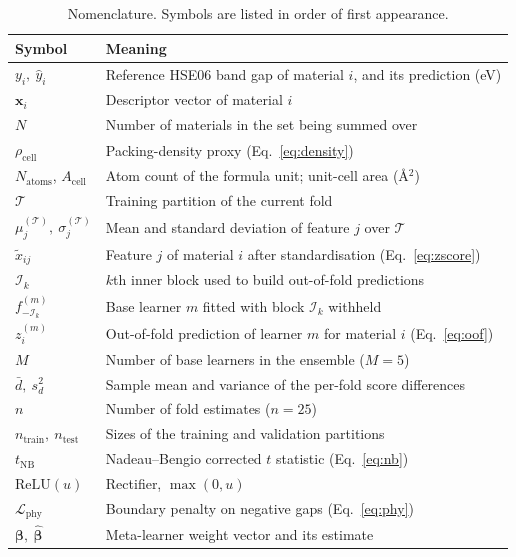 \documentclass{ieeeaccess}
\begin{document}
\begin{table}[!t]
\caption{Nomenclature. Symbols are listed in order of first appearance.\label{tab:nomenclature}}
\centering
\small
\begin{tabular}{@{}p{}p{}@{}}
\toprule
Symbol & Meaning \\
\midrule
$y_i,\ \hat{y}_i$ & Reference HSE06 band gap of material $i$, and its prediction (eV) \\
$\mathbf{x}_i$ & Descriptor vector of material $i$ \\
$N$ & Number of materials in the set being summed over \\
$\rho_{\mathrm{cell}}$ & Packing-density proxy (Eq.~\eqref{eq:density}) \\
$N_{\mathrm{atoms}}$, $A_{\mathrm{cell}}$ & Atom count of the formula unit; unit-cell area (\AA$^2$) \\
$\mathcal{T}$ & Training partition of the current fold \\
$\mu_j^{(\mathcal{T})},\ \sigma_j^{(\mathcal{T})}$ & Mean and standard deviation of feature $j$ over $\mathcal{T}$ \\
$\tilde{x}_{ij}$ & Feature $j$ of material $i$ after standardisation (Eq.~\eqref{eq:zscore}) \\
$\mathcal{I}_k$ & $k$th inner block used to build out-of-fold predictions \\
$f^{(m)}_{-\mathcal{I}_k}$ & Base learner $m$ fitted with block $\mathcal{I}_k$ withheld \\
$z_i^{(m)}$ & Out-of-fold prediction of learner $m$ for material $i$ (Eq.~\eqref{eq:oof}) \\
$M$ & Number of base learners in the ensemble ($M=5$) \\
$\bar{d},\ s_d^2$ & Sample mean and variance of the per-fold score differences \\
$n$ & Number of fold estimates ($n=25$) \\
$n_{\mathrm{train}},\ n_{\mathrm{test}}$ & Sizes of the training and validation partitions \\
$t_{\mathrm{NB}}$ & Nadeau--Bengio corrected $t$ statistic (Eq.~\eqref{eq:nb}) \\
$\mathrm{ReLU}(u)$ & Rectifier, $\max(0,u)$ \\
$\mathcal{L}_{\mathrm{phy}}$ & Boundary penalty on negative gaps (Eq.~\eqref{eq:phy}) \\
$\boldsymbol{\beta},\ \hat{\boldsymbol{\beta}}$ & Meta-learner weight vector and its estimate \\

\end{tabular}
\end{table}
\end{document}
